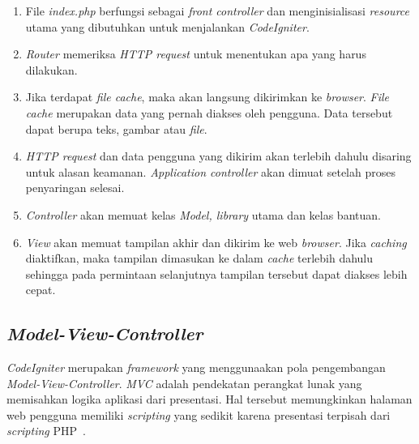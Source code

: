 \begin{enumerate}
	\item File \textit{index.php} berfungsi sebagai \textit{front controller} dan menginisialisasi \textit{resource} utama yang dibutuhkan untuk menjalankan \textit{CodeIgniter}.
	\item \textit{Router} memeriksa \textit{HTTP request} untuk menentukan apa yang harus dilakukan.
	\item Jika terdapat \textit{file cache}, maka akan langsung dikirimkan ke \textit{browser}. \textit{File cache} merupakan data yang pernah diakses oleh pengguna. Data tersebut dapat berupa teks, gambar atau \textit{file}. 
	\item \textit{HTTP request} dan data pengguna yang dikirim akan terlebih dahulu disaring untuk alasan keamanan. \textit{Application controller} akan dimuat setelah proses penyaringan selesai.
	\item \textit{Controller} akan memuat kelas \textit{Model, library} utama dan kelas bantuan.
	\item \textit{View} akan memuat tampilan akhir dan dikirim ke web \textit{browser}. Jika \textit{caching} diaktifkan, maka tampilan dimasukan ke dalam \textit{cache} terlebih dahulu sehingga pada permintaan selanjutnya tampilan tersebut dapat diakses lebih cepat.
\end{enumerate}

\subsection{\textit{Model-View-Controller}}
\label{sec:mvc}
\textit{CodeIgniter} merupakan \textit{framework} yang menggunaakan pola pengembangan \textit{Model-View-Controller}. \textit{MVC} adalah pendekatan perangkat lunak yang memisahkan logika aplikasi dari presentasi. Hal tersebut memungkinkan halaman web pengguna memiliki \textit{scripting} yang sedikit karena presentasi terpisah dari \textit{scripting} PHP~\cite{bcit:17:cidoc}. \\

